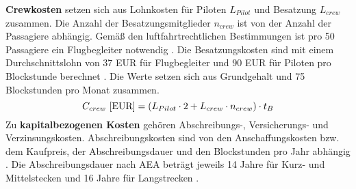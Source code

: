 \textbf{Crewkosten} setzen sich aus Lohnkosten für Piloten $L_{Pilot}$ und Besatzung $L_{crew}$ zusammen. 
Die Anzahl der Besatzungsmitglieder $n_{crew}$ ist von der Anzahl der Passagiere abhängig. 
Gemäß den luftfahrtrechtlichen Bestimmungen ist pro 50 Passagiere ein Flugbegleiter notwendig \cite{conrady2019luftverkehr}.
Die Besatzungskosten sind mit einem Durchschnittslohn von 37 EUR für Flugbegleiter 
und 90 EUR für Piloten pro Blockstunde berechnet \cite{discover_airlines_cabin}.
Die Werte setzen sich aus Grundgehalt und 75 Blockstunden pro Monat zusammen.
%
\begin{equation}
   {C_{crew} ~[\text{EUR}]} = ({L}_{Pilot} \cdot 2 + {L}_{crew} \cdot n_{crew} ) \cdot t_{B} \\
   \label{crew cost}
\end{equation}
%
%
Zu \textbf{kapitalbezogenen Kosten} gehören Abschreibungs-, Versicherungs- und Verzinsungskosten. 
Abschreibungskosten sind von den Anschaffungskosten bzw. dem Kaufpreis, 
der Abschreibungsdauer und den Blockstunden pro Jahr abhängig \cite{conrady2019luftverkehr}.
Die Abschreibungsdauer nach AEA beträgt jeweils 14 Jahre für 
Kurz- und Mittelstecken und 16 Jahre für Langstrecken \cite{scholz_design_evaluation_doc}.

